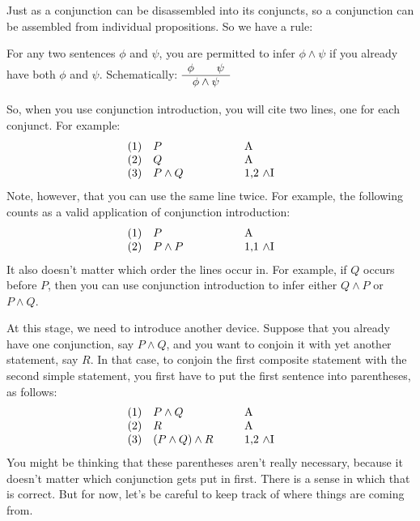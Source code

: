Just as a conjunction can be disassembled into its conjuncts, so a
conjunction can be assembled from individual propositions.  So we have
a rule:

\bigskip
\begin{tcolorbox}[enhanced,width=10cm,title=conjunction introduction
  ($\wedge$I),attach boxed title to top
  left={yshift=-2mm,xshift=4mm},boxed title style={sharp corners}]
  For any two sentences $\phi$ and $\psi$, you are permitted to infer
  $\phi\wedge \psi$ if you already have both $\phi$ and
  $\psi$. \newline 
  Schematically: $\begin{array}{c c}
       \phi \qquad  \psi \\ \hline
       \phi \wedge \psi \end{array} $ \end{tcolorbox}

\bigskip 

So, when you use conjunction introduction, you will cite two lines, one for
each conjunct.  For example: \[ \begin{array}{l >{$}p{2.5cm}<{$} p{1.5cm}}
                    (1) & P & A   \\
                    (2) & Q & A   \\
                    (3) & P\wedge Q & 1,2 $\wedge$I
                                \end{array} \]
Note, however, that you can use the same line twice.  For example, the
following counts as a valid application of conjunction introduction:
\[ \begin{array}{l >{$}p{2.5cm}<{$} p{1.5cm}}
     (1) & P  & A   \\
     (2) & P\wedge P & 1,1
                       $\wedge$I \end{array} \] It also doesn't matter
 which order the lines occur in.  For example, if $Q$ occurs before $P$, then you can use conjunction introduction to infer either $Q\wedge P$ or $P\wedge Q$.
                                   
At this stage, we need to introduce another device.  Suppose that you
already have one conjunction, say $P\wedge Q$, and you want to
conjoin it with yet another statement, say $R$.  In that case, to
conjoin the first composite statement with the second simple
statement, you first have to put the first sentence into parentheses,
as follows:
  \[ \begin{array}{l >{$}p{2.5cm}<{$} p{1.5cm}}
      (1) & P\wedge Q & A    \\
       (2) & R  & A  \\
       (3) & (P\wedge Q)\wedge R &  1,2 $\wedge$I \end{array} \]
You might be thinking that these parentheses aren't really necessary,
because it doesn't matter which conjunction gets put in first.  There
is a sense in which that is correct.  But for now, let's be careful to
keep track of where things are coming from.

